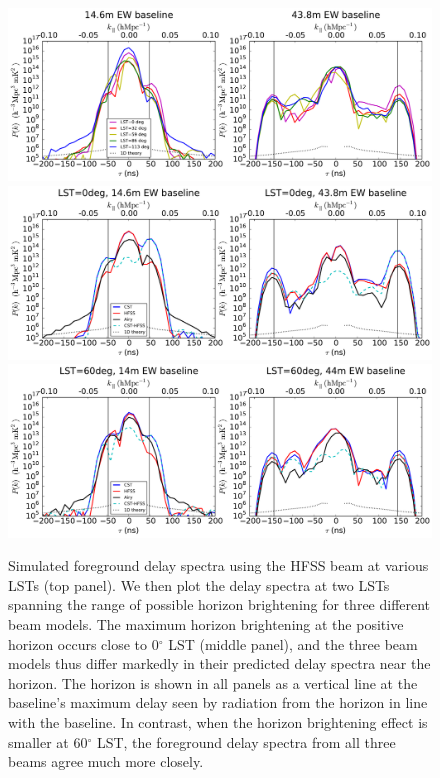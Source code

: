 \documentclass{emulateapj}
\begin{document}
\begin{figure}[h]
\centering
\includegraphics[width=6in]{nithya_fg_pspec_all_lst.pdf}
\includegraphics[width=6in]{nithya_fg_pspec_lst0deg.pdf}
\includegraphics[width=6in]{nithya_fg_pspec_lst60deg.pdf}
\caption{Simulated foreground delay spectra using the HFSS beam at various LSTs (top panel). We then plot the delay spectra at two LSTs spanning the range of possible horizon brightening for three different beam models. The maximum horizon brightening at the positive horizon occurs close to 0$^\circ$ LST (middle panel), and the three beam models thus differ markedly in their predicted delay spectra near the horizon. The horizon is shown in all panels as a vertical line at the baseline's maximum delay seen by radiation from the horizon in line with the baseline. In contrast, when the horizon brightening effect is smaller at 60$^\circ$ LST, the foreground delay spectra from all three beams agree much more closely.}
\label{fig:delayspec}
\end{figure}
\end{document}
